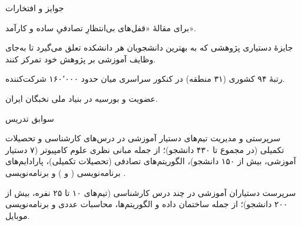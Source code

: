 \documentclass[11pt]{article}
\begin{document}
\begin{faSection}{جوایز و افتخارات}

برای مقالۀ «قفل‌های بی‌انتظارِ تصادفیِ ساده و کارآمد».

\vspace{0.4em}
جایزۀ دستیاری پژوهشی که به بهترین دانشجویان هر دانشکده تعلق می‌گیرد تا به‌جای وظایف آموزشی بر پژوهش خود تمرکز کنند.

\vspace{0.4em}
رتبۀ ۹۴ کشوری (۳۱ منطقه) در کنکور سراسری میان حدود ۱۶۰٬۰۰۰ شرکت‌کننده.

\vspace{0.4em}
عضویت و بورسیه در بنیاد ملی نخبگان ایران.

\end{faSection}

\begin{faSection}{سوابق تدریس}

سرپرستی و مدیریت تیم‌های دستیار آموزشی در درس‌های کارشناسی و تحصیلات تکمیلی (در مجموع تا ۴۳۰ دانشجو)؛ از جمله مبانی نظری علوم کامپیوتر (۷ دستیار آموزشی، بیش از ۱۵۰ دانشجو)، الگوریتم‌های تصادفی (تحصیلات تکمیلی)، پارادایم‌های برنامه‌نویسی ( و ) و برنامه‌نویسی .

\vspace{0.5em}
سرپرست دستیاران آموزشی در چند درس کارشناسی (تیم‌های ۱۰ تا ۲۵ نفره، بیش از ۲۰۰ دانشجو)؛ از جمله ساختمان داده و الگوریتم‌ها، محاسبات عددی و برنامه‌نویسی موبایل.

\end{faSection}
\end{document}
